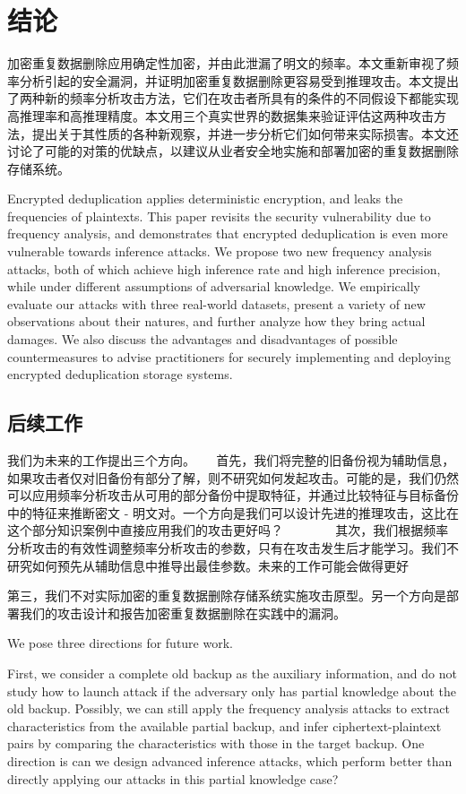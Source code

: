 \chapter{结论}
\label{sec:Conclusion}

加密重复数据删除应用确定性加密，并由此泄漏了明文的频率。本文重新审视了频率分析引起的安全漏洞，并证明加密重复数据删除更容易受到推理攻击。本文提出了两种新的频率分析攻击方法，它们在攻击者所具有的条件的不同假设下都能实现高推理率和高推理精度。本文用三个真实世界的数据集来验证评估这两种攻击方法，提出关于其性质的各种新观察，并进一步分析它们如何带来实际损害。本文还讨论了可能的对策的优缺点，以建议从业者安全地实施和部署加密的重复数据删除存储系统。

Encrypted deduplication applies deterministic encryption, and leaks the frequencies of plaintexts. This paper revisits the security vulnerability  due to frequency analysis, and demonstrates that encrypted deduplication is even more vulnerable towards inference attacks. We propose two new frequency analysis attacks, both of which  achieve high inference rate and high inference precision, while under different assumptions of adversarial knowledge. We empirically evaluate our attacks with three real-world datasets, present a variety of new observations about their natures, and further analyze how they bring actual damages. We also discuss the advantages and disadvantages of possible countermeasures to advise practitioners for securely implementing and deploying encrypted deduplication storage systems. 
     
\section{后续工作}

我们为未来的工作提出三个方向。
 
 首先，我们将完整的旧备份视为辅助信息，如果攻击者仅对旧备份有部分了解，则不研究如何发起攻击。可能的是，我们仍然可以应用频率分析攻击从可用的部分备份中提取特征，并通过比较特征与目标备份中的特征来推断密文 - 明文对。一个方向是我们可以设计先进的推理攻击，这比在这个部分知识案例中直接应用我们的攻击更好吗？
      
 其次，我们根据频率分析攻击的有效性调整频率分析攻击的参数，只有在攻击发生后才能学习。我们不研究如何预先从辅助信息中推导出最佳参数。未来的工作可能会做得更好
 


第三，我们不对实际加密的重复数据删除存储系统实施攻击原型。另一个方向是部署我们的攻击设计和报告加密重复数据删除在实践中的漏洞。


 We pose three directions for future work. 
 
 First, we consider a complete old backup as the auxiliary information, and do not study how to launch attack if the adversary only has partial knowledge about the old backup. Possibly, we can still apply the frequency analysis attacks to extract characteristics from the available partial backup, and infer ciphertext-plaintext pairs by comparing the characteristics with those in the target backup. One direction is can we design advanced inference attacks, which  perform better than directly applying our attacks in this partial knowledge case?  
      

